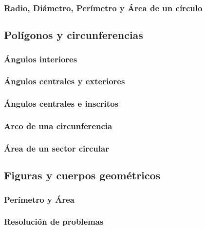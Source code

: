 \documentclass[12pt,repaso,answers]{RDS_unit}
\begin{document}
\begin{questions}
	\subsubsection{Radio, Diámetro, Perímetro y Área de un círculo}
	\question[1]{}
	\subsection   {Polígonos y circunferencias}
	\subsubsection{Ángulos interiores}
	\question[1]{}
	\subsubsection{Ángulos centrales y exteriores}
	\question[1]{}
	\subsubsection{Ángulos centrales e inscritos}
	\question[1]{}
	\subsubsection{Arco de una circunferencia}
	\question[1]{}
	\subsubsection{Área de un sector circular}
	\question[1]{}
	\subsection   {Figuras y cuerpos geométricos}
	\subsubsection{Perímetro y Área}
	\question[1]{}
	\subsubsection{Resolución de problemas}
	\question[1]{}

\end{questions}
\end{document}

